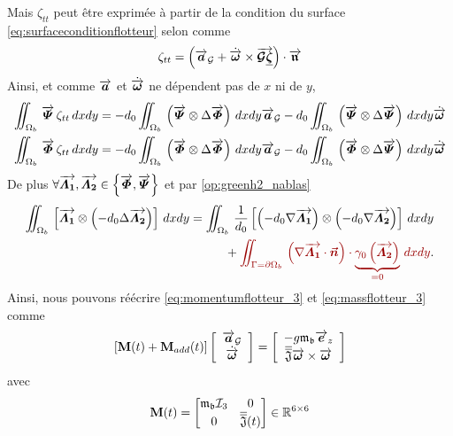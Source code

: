 \noindent Mais $\zeta_{tt}$ peut être exprimée à partir de la condition du surface \eqref{eq:surfaceconditionflotteur} selon \citet{lannes_dynamics_2017} comme
\begin{equation}
	\zeta_{tt} = \left(\overrightarrow{\boldsymbol{a}}_\mathcal{G} + \dot{\overrightarrow{\boldsymbol{\omega}}} \times \overrightarrow{\boldsymbol{\mathcal{G}\underline{\zeta}}}\right)\cdot \overrightarrow{\boldsymbol{\mathfrak{n}}}\label{eq:surfaceflotteur_new}
\end{equation}
Ainsi, et comme $\overrightarrow{\boldsymbol{a}}$ et $\dot{\overrightarrow{\boldsymbol{\omega}}}$ ne dépendent pas de $x$ ni de $y$,
\begin{align}
	\iint_{\Omega_b}\,\overrightarrow{\boldsymbol{\varPsi}}\,\zeta_{tt}\,dxdy &= -d_0\iint_{\Omega_b}\,\left(\overrightarrow{\boldsymbol{\varPsi}} \otimes \Delta \overrightarrow{\boldsymbol{\varPhi}}\right)\,dxdy\overrightarrow{\boldsymbol{a}}_\mathcal{G}-d_0\iint_{\Omega_b}\,\left(\overrightarrow{\boldsymbol{\varPsi}}\otimes\Delta \overrightarrow{\boldsymbol{\varPsi}}\right)\,dxdy\dot{\overrightarrow{\boldsymbol{\omega}}}\\
	\iint_{\Omega_b}\,\overrightarrow{\boldsymbol{\varPhi}}\,\zeta_{tt}\,dxdy &= -d_0\iint_{\Omega_b}\,\left(\overrightarrow{\boldsymbol{\varPhi}} \otimes \Delta \overrightarrow{\boldsymbol{\varPhi}}\right)\,dxdy\overrightarrow{\boldsymbol{a}}_\mathcal{G}-d_0\iint_{\Omega_b}\,\left(\overrightarrow{\boldsymbol{\varPhi}}\otimes\Delta \overrightarrow{\boldsymbol{\varPsi}}\right)\,dxdy\dot{\overrightarrow{\boldsymbol{\omega}}}
\end{align}
De plus $\forall \overrightarrow{\boldsymbol{\varLambda_1}}, \overrightarrow{\boldsymbol{\varLambda_2}} \in \left\{\overrightarrow{\boldsymbol{\varPhi}}, \overrightarrow{\boldsymbol{\varPsi}}\right\}$ et par \eqref{op:greenh2_nablas}
\begin{align*}
	\iint_{\Omega_b}\,\left[\boldvec{\varLambda_1} \otimes \left(-d_0\Delta \boldvec{\varLambda_2}\right)\right]\,dxdy &= \iint_{\Omega_b}\,\frac{1}{d_0}\left[\left(-d_0\nabla \boldvec{\varLambda_1}\right) \otimes \left(-d_0\nabla \boldvec{\varLambda_2}\right)\right]\,dxdy \\
	&\hspace{1cm}+ \textcolor{MyRed}{\iint_{\Gamma = \partial\Omega_b}\,\left(\nabla\boldvec{\varLambda_1} \cdot \nvec\right)\cdot \underbrace{\gamma_0\left(\boldvec{\varLambda_2}\right)}_{= 0} \,dxdy}.
\end{align*}
Ainsi, nous pouvons réécrire \eqref{eq:momentumflotteur_3} et \eqref{eq:massflotteur_3} comme
\begin{equation}
	\left[\mathbf{M}(t) + \mathbf{M}_{add}(t)\right]\left[\begin{array}{c} \overrightarrow{\boldsymbol{a}}_\mathcal{G}\\ \dot{\overrightarrow{\boldsymbol{\omega}}}\\  \end{array}\right] = \left[\begin{array}{c} -g\mathfrak{m}_{\mathfrak{b}}\overrightarrow{\boldsymbol{e}}_z\\ \overline{\overline{\mathfrak{J}}}\overrightarrow{\boldsymbol{\omega}} \times\overrightarrow{\boldsymbol{\omega}}\\  \end{array}\right]\label{eq:massadded}
\end{equation}
avec
\begin{equation}
	\mathbf{M}(t) = \begin{bmatrix}
	\mathfrak{m}_{\mathfrak{b}}\mathcal{I}_3 & 0\\
	0 & \overline{\overline{\mathfrak{J}}}(t)
	\end{bmatrix} \in \mathbb{R}^{6\times 6}
\end{equation}
